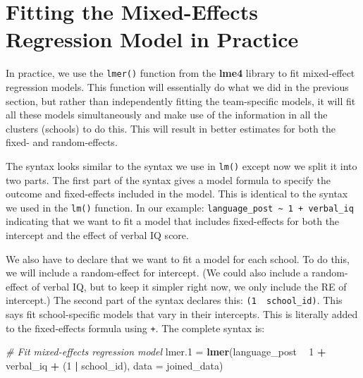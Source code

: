 \documentclass[]{book}
\newenvironment{Shaded}{\begin{snugshade}}{\end{snugshade}}
\newcommand{\CommentTok}[1]{\textcolor[rgb]{0.56,0.35,0.01}{\textit{#1}}}
\newcommand{\DataTypeTok}[1]{\textcolor[rgb]{0.13,0.29,0.53}{#1}}
\newcommand{\DecValTok}[1]{\textcolor[rgb]{0.00,0.00,0.81}{#1}}
\newcommand{\FloatTok}[1]{\textcolor[rgb]{0.00,0.00,0.81}{#1}}
\newcommand{\KeywordTok}[1]{\textcolor[rgb]{0.13,0.29,0.53}{\textbf{#1}}}
\newcommand{\NormalTok}[1]{#1}
\newcommand{\OperatorTok}[1]{\textcolor[rgb]{0.81,0.36,0.00}{\textbf{#1}}}
\newcommand{\StringTok}[1]{\textcolor[rgb]{0.31,0.60,0.02}{#1}}
\begin{document}
\hypertarget{fitting-the-mixed-effects-regression-model-in-practice}{%
\section{Fitting the Mixed-Effects Regression Model in Practice}\label{fitting-the-mixed-effects-regression-model-in-practice}}

In practice, we use the \texttt{lmer()} function from the \textbf{lme4} library to fit mixed-effect regression models. This function will essentially do what we did in the previous section, but rather than independently fitting the team-specific models, it will fit all these models simultaneously and make use of the information in all the clusters (schools) to do this. This will result in better estimates for both the fixed- and random-effects.

The syntax looks similar to the syntax we use in \texttt{lm()} except now we split it into two parts. The first part of the syntax gives a model formula to specify the outcome and fixed-effects included in the model. This is identical to the syntax we used in the \texttt{lm()} function. In our example: \texttt{language\_post\ \textasciitilde{}\ 1\ +\ verbal\_iq} indicating that we want to fit a model that includes fixed-effects for both the intercept and the effect of verbal IQ score.

We also have to declare that we want to fit a model for each school. To do this, we will include a random-effect for intercept. (We could also include a random-effect of verbal IQ, but to keep it simpler right now, we only include the RE of intercept.) The second part of the syntax declares this: \texttt{(1\ \textbar{}\ school\_id)}. This says fit school-specific models that vary in their intercepts. This is literally added to the fixed-effects formula using \texttt{+}. The complete syntax is:

\begin{Shaded}
\begin{Highlighting}[]
\CommentTok{# Fit mixed-effects regression model}
\NormalTok{lmer}\FloatTok{.1}\NormalTok{ =}\StringTok{ }\KeywordTok{lmer}\NormalTok{(language_post }\OperatorTok{~}\StringTok{ }\DecValTok{1} \OperatorTok{+}\StringTok{ }\NormalTok{verbal_iq }\OperatorTok{+}\StringTok{ }\NormalTok{(}\DecValTok{1} \OperatorTok{|}\StringTok{ }\NormalTok{school_id), }\DataTypeTok{data =}\NormalTok{ joined_data)}
\end{Highlighting}
\end{Shaded}
\end{document}
